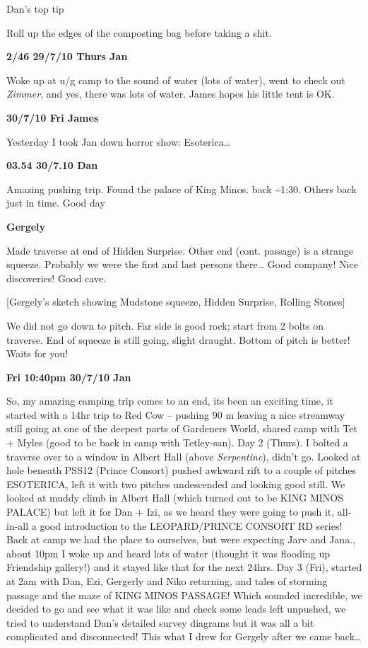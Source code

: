 Dan's top tip

Roll up the edges of the composting bag before taking a shit.

\textbf{2/46 29/7/10 Thurs Jan}

Woke up at u/g camp to the sound of water (lots of water), went to check
out \emph{Zimmer}, and yes, there was lots of water. James hopes his
little tent is OK.

\textbf{30/7/10 Fri James}

Yesterday I took Jan down horror show: Esoterica\ldots{}

\textbf{03.54 30/7.10 Dan}

Amazing pushing trip. Found the palace of King Minos. back
\textasciitilde 1:30. Others back just in time. Good day

\textbf{Gergely}

Made traverse at end of Hidden Surprise. Other end (cont. passage) is a
strange squeeze. Probably we were the first and last persons
there\ldots{} Good company! Nice discoveries! Good cave.

{[}Gergely's sketch showing Mudstone squeeze, Hidden Surprise, Rolling
Stones{]}

We did not go down to pitch. Far side is good rock; start from 2 bolts
on traverse. End of squeeze is still going, slight draught. Bottom of
pitch is better! Waits for you!

\textbf{Fri 10:40pm 30/7/10 Jan}

So, my amazing camping trip comes to an end, its been an exciting time,
it started with a 14hr trip to Red Cow -- pushing 90 m leaving a nice
streamway still going at one of the deepest parts of Gardeners World,
shared camp with Tet + Myles (good to be back in camp with Tetley-san).
Day 2 (Thurs). I bolted a traverse over to a window in Albert Hall
(above \emph{Serpentine}), didn't go. Looked at hole beneath PSS12
(Prince Consort) pushed awkward rift to a couple of pitches ESOTERICA,
left it with two pitches undescended and looking good still. We looked
at muddy climb in Albert Hall (which turned out to be KING MINOS PALACE)
but left it for Dan + Izi, as we heard they were going to push it,
all-in-all a good introduction to the LEOPARD/PRINCE CONSORT RD series!
Back at camp we had the place to ourselves, but were expecting Jarv and
Jana., about 10pm I woke up and heard lots of water (thought it was
flooding up Friendship gallery!) and it stayed like that for the next
24hrs. Day 3 (Fri), started at 2am with Dan, Ezi, Gergerly and Niko
returning, and tales of storming passage and the maze of KING MINOS
PASSAGE! Which sounded incredible, we decided to go and see what it was
like and check some leads left unpushed, we tried to understand Dan's
detailed survey diagrams but it was all a bit complicated and
disconnected! This what I drew for Gergely after we came back\ldots{}

